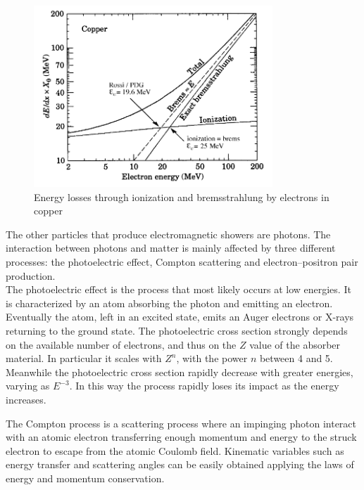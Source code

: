 \begin{figure}
	\centering
	\includegraphics[width=0.8\textwidth]{IMG/Cap2/Cu_rad_ion}
	\caption{Energy losses through ionization and bremsstrahlung by  electrons in copper \cite{PDG_98}}
	\label{fig:Cu_rad_ion}
\end{figure}

The other particles that produce electromagnetic showers are photons. The interaction between photons and matter is mainly affected by three different processes: the photoelectric effect, Compton scattering and electron–positron pair production.\\
The photoelectric effect is the process that most likely occurs at low energies. It is characterized by an atom absorbing the photon and emitting an electron. Eventually the atom, left in an excited state, emits an Auger electrons or X-rays returning to the ground state. The photoelectric cross section strongly depends on the available number of  electrons,  and  thus  on  the $Z$ value  of  the  absorber  material. In particular it scales with $Z^n$, with the power $n$ between 4 and 5. Meanwhile the photoelectric cross section rapidly decrease with greater energies, varying as $E^{-3}$. In this way the process rapidly loses its impact as the energy increases. %

The Compton process is a scattering process where an impinging  photon interact with an atomic electron transferring enough momentum and energy to the struck electron to escape from the atomic Coulomb field. Kinematic variables such as energy transfer and scattering angles can be easily obtained applying the laws of energy and momentum conservation. 

